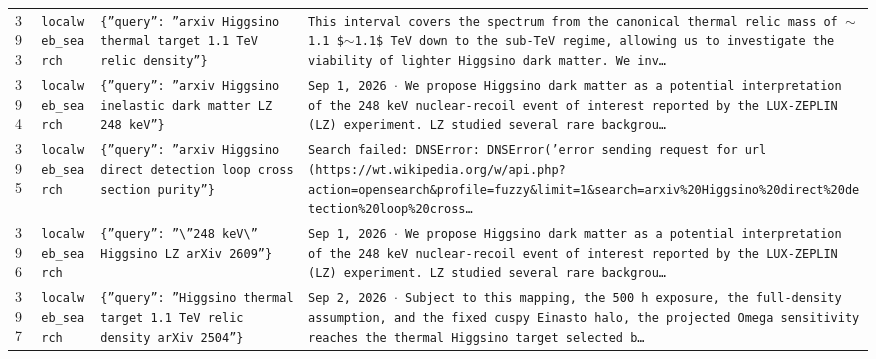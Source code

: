 \documentclass[11pt,a4paper]{article}
\begin{document}
\begin{longtable}{@{}p{}p{}p{}p{}@{}}
393 & \texttt{local}\newline\texttt{web\_\allowbreak{}search} & \texttt{\{''query'':\allowbreak{} ''arxiv Higgsino thermal target 1.1 TeV relic density''\}\allowbreak{}} & \texttt{This interval covers the spectrum from the canonical thermal relic mass of $\sim$ 1.1 \$$\sim$1.1\$ TeV down to the sub-TeV regime,\allowbreak{} allowing us to investigate the viability of lighter Higgsino dark matter. We inv\ldots{}\allowbreak{}} \\
394 & \texttt{local}\newline\texttt{web\_\allowbreak{}search} & \texttt{\{''query'':\allowbreak{} ''arxiv Higgsino inelastic dark matter LZ 248 keV''\}\allowbreak{}} & \texttt{Sep 1,\allowbreak{} 2026 $\cdot$ We propose Higgsino dark matter as a potential interpretation of the 248 keV nuclear-recoil event of interest reported by the LUX-ZEPLIN (LZ)\allowbreak{} experiment. LZ studied several rare backgrou\ldots{}\allowbreak{}} \\
395 & \texttt{local}\newline\texttt{web\_\allowbreak{}search} & \texttt{\{''query'':\allowbreak{} ''arxiv Higgsino direct detection loop cross section purity''\}\allowbreak{}} & \texttt{Search failed:\allowbreak{} DNSError:\allowbreak{} DNSError('error sending request for url (https:\allowbreak{}/\allowbreak{}/\allowbreak{}wt.wikipedia.org/\allowbreak{}w/\allowbreak{}api.php?action=\allowbreak{}opensearch\&profile=\allowbreak{}fuzzy\&limit=\allowbreak{}1\&search=\allowbreak{}arxiv\%20Higgsino\%20direct\%20detection\%20loop\%20cross\ldots{}\allowbreak{}} \\
396 & \texttt{local}\newline\texttt{web\_\allowbreak{}search} & \texttt{\{''query'':\allowbreak{} ''\textbackslash{}\allowbreak{}''248 keV\textbackslash{}\allowbreak{}'' Higgsino LZ arXiv 2609''\}\allowbreak{}} & \texttt{Sep 1,\allowbreak{} 2026 $\cdot$ We propose Higgsino dark matter as a potential interpretation of the 248 keV nuclear-recoil event of interest reported by the LUX-ZEPLIN (LZ)\allowbreak{} experiment. LZ studied several rare backgrou\ldots{}\allowbreak{}} \\
397 & \texttt{local}\newline\texttt{web\_\allowbreak{}search} & \texttt{\{''query'':\allowbreak{} ''Higgsino thermal target 1.1 TeV relic density arXiv 2504''\}\allowbreak{}} & \texttt{Sep 2,\allowbreak{} 2026 $\cdot$ Subject to this mapping,\allowbreak{} the 500 h exposure,\allowbreak{} the full-density assumption,\allowbreak{} and the fixed cuspy Einasto halo,\allowbreak{} the projected Omega sensitivity reaches the thermal Higgsino target selected b\ldots{}\allowbreak{}} \\

\end{longtable}
\end{document}
